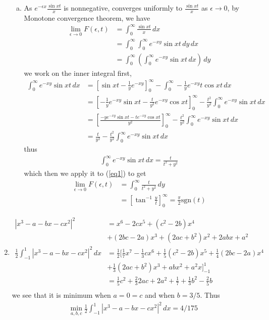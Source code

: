 \documentclass[a4paper,12pt]{article}
\theoremstyle{definition}
\begin{document}
\begin{enumerate}
\begin{enumerate}[(a)]
\item 
As $e^{-\epsilon x}\frac{\sin xt}{x}$ is nonnegative, converges uniformly to $\frac{\sin xt}{x}$ as $\epsilon \to 0$, by Monotone convergence theorem, we have 
\begin{align}
\lim_{\epsilon \to 0}F(\epsilon,t) &= \int_{0}^{\infty}\frac{\sin xt}{x}\,dx \nonumber \\
&= \int_{0}^{\infty}\int_{0}^{\infty}e^{-xy}\sin xt\,dy\,dx \nonumber \\
&= \int_{0}^{\infty}\left(\int_{0}^{\infty}e^{-xy}\sin xt\,dx\right)\,dy \label{eq1}
\end{align}
we work on the inner integral first,
\begin{align*}
\int_{0}^{\infty}e^{-xy}\sin xt\,dx&=\left[\sin xt -\frac{1}{y}e^{-xy}\right]_{0}^{\infty}-\int_{0}^{\infty}-\frac{1}{y}e^{-xy} t\cos xt\,dx\\
&=\left[-\frac{1}{y}e^{-xy}\sin xt -\frac{t}{y^2}e^{-xy}\cos xt \right]_{0}^{\infty}-\frac{t^2}{y^2}\int_{0}^{\infty}e^{-xy} \sin xt\,dx\\
&=\left[\frac{-ye^{-xy}\sin xt-te^{-xy}\cos xt}{y^2} \right]_{0}^{\infty}-\frac{t^2}{y^2}\int_{0}^{\infty}e^{-xy} \sin xt\,dx\\
&=\frac{t}{y^2}-\frac{t^2}{y^2}\int_{0}^{\infty}e^{-xy} \sin xt\,dx
\end{align*}
thus
\begin{align*}
\int_{0}^{\infty}e^{-xy}\sin xt\,dx = \frac{t}{t^2+y^2}
\end{align*}
which then we apply it to (\ref{eq1}) to get
\begin{align*}
\lim_{\epsilon \to 0}F(\epsilon,t) &= \int_{0}^{\infty}\frac{t}{t^2+y^2}\,dy\\
&= \left[\tan^{-1}\frac{y}{t}\right]_{0}^{\infty}=\frac{\pi}{2}\text{sgn}(t)
\end{align*}


\end{enumerate}
\item
\begin{align*}
|x^3-a-bx-cx^2|^2& = x^6-2cx^5+(c^2-2b)x^4\\
&+(2bc-2a)x^3+(2ac+b^2)x^2+2abx+a^2\\
\frac{1}{2}\int_{-1}^{1}|x^3-a-bx-cx^2|^2\,dx &= \frac{1}{2}\Bigg[\frac{1}{7}x^7-\frac{1}{3}cx^6+\frac{1}{5}(c^2-2b)x^5+\frac{1}{4}(2bc-2a)x^4\\
&+\frac{1}{3}(2ac+b^2)x^3+abx^2+a^2x\Bigg]_{-1}^{1}\\
&=\frac{1}{5}c^2+\frac{2}{3}2ac+2a^2+\frac{1}{7}+\frac{1}{3}b^2-\frac{2}{5}b\\
\end{align*}
we see that it is minimum when $a=0=c$ and when $b = 3/5$. Thus
\begin{align*}
\min_{a,b,c} \frac{1}{2} \int_{-1}^{1}|x^3-a-bx-cx^2|^2\,dx = 4/175
\end{align*}



\end{enumerate}
\end{document}
